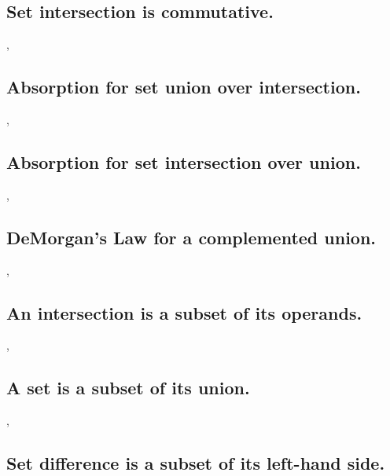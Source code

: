 \documentclass[preview]{standalone}
\begin{document}
\subsection{Set intersection is commutative.}

\sep

\subsection{Absorption for set union over intersection.}

\sep
\pagebreak


\subsection{Absorption for set intersection over union.}

\sep


\subsection{DeMorgan's Law for a complemented union.}

\sep
\pagebreak


\subsection{An intersection is a subset of its operands.}

\sep


\subsection{A set is a subset of its union.}

\sep


\subsection{Set difference is a subset of its left-hand side.}

\pagebreak
\end{document}
